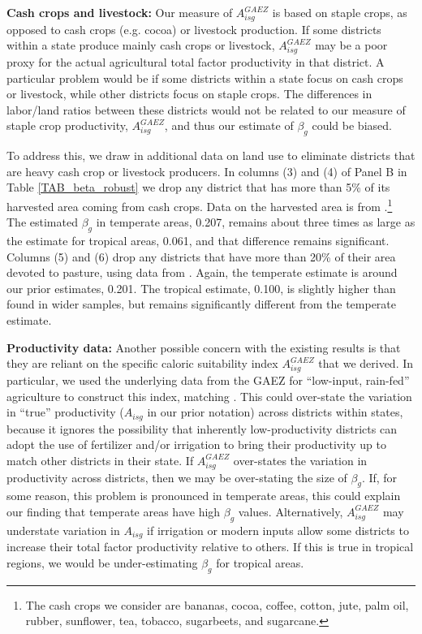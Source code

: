 \documentclass[11pt]{article}
\begin{document}
\vspace{.5cm}\noindent\textbf{Cash crops and livestock:} Our measure of $A_{isg}^{GAEZ}$ is based on staple crops, as opposed to cash crops (e.g. cocoa) or livestock production. If some districts within a state produce mainly cash crops or livestock, $A_{isg}^{GAEZ}$ may be a poor proxy for the actual agricultural total factor productivity in that district. A particular problem would be if some districts within a state focus on cash crops or livestock, while other districts focus on staple crops. The differences in labor/land ratios between these districts would not be related to our measure of staple crop productivity, $A_{isg}^{GAEZ}$, and thus our estimate of $\beta_g$ could be biased. 

To address this, we draw in additional data on land use to eliminate districts that are heavy cash crop or livestock producers. In columns (3) and (4) of Panel B in Table \ref{TAB_beta_robust} we drop any district that has more than 5\% of its harvested area coming from cash crops. Data on the harvested area is from \cite{mrf2008}.\footnote{The cash crops we consider are bananas, cocoa, coffee, cotton, jute, palm oil, rubber, sunflower, tea, tobacco, sugarbeets, and sugarcane.} The estimated $\beta_g$ in temperate areas, 0.207, remains about three times as large as the estimate for tropical areas, 0.061, and that difference remains significant. Columns (5) and (6) drop any districts that have more than 20\% of their area devoted to pasture, using data from \cite{remf2008}. Again, the temperate estimate is around our prior estimates, 0.201. The tropical estimate, 0.100, is slightly higher than found in wider samples, but remains significantly different from the temperate estimate.

\vspace{.5cm}\noindent\textbf{Productivity data:} Another possible concern with the existing results is that they are reliant on the specific caloric suitability index $A_{isg}^{GAEZ}$ that we derived. In particular, we used the underlying data from the GAEZ for ``low-input, rain-fed'' agriculture to construct this index, matching \cite{galorozak2016}. This could over-state the variation in ``true'' productivity ($A_{isg}$ in our prior notation) across districts within states, because it ignores the possibility that inherently low-productivity districts can adopt the use of fertilizer and/or irrigation to bring their productivity up to match other districts in their state. If $A_{isg}^{GAEZ}$ over-states the variation in productivity across districts, then we may be over-stating the size of $\beta_g$. If, for some reason, this problem is pronounced in temperate areas, this could explain our finding that temperate areas have high $\beta_g$ values. Alternatively, $A_{isg}^{GAEZ}$ may understate variation in $A_{isg}$ if irrigation or modern inputs allow some districts to increase their total factor productivity relative to others. If this is true in tropical regions, we would be under-estimating $\beta_g$ for tropical areas.
\end{document}
